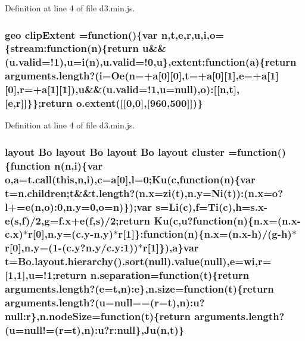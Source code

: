 Definition at line 4 of file d3.\+min.\+js.

\subsubsection[{clip\+Extent}]{ {\bf geo} clip\+Extent =function()\{var {\bf n},t,{\bf e},{\bf r},u,{\bf i},{\bf o}=\{stream\+:function({\bf n})\{{\bf return} u\&\&(u.\+valid=!1),u={\bf i}({\bf n}),u.\+valid=!0,u\},extent\+:function({\bf a})\{{\bf return} arguments.\+length?({\bf i}=Oe({\bf n}=+{\bf a}[0][0],t=+{\bf a}[0][1],{\bf e}=+{\bf a}[1][0],{\bf r}=+{\bf a}[1][1]),u\&\&(u.\+valid=!1,u=null),{\bf o})\+:[[{\bf n},t],[{\bf e},{\bf r}]]\}\};{\bf return} {\bf o.\+extent}([[0,0],[960,500]])\}}\label{d3_8min_8js_ac75a0100b76ea2ac37554c51f4b571b5}


Definition at line 4 of file d3.\+min.\+js.

\subsubsection[{cluster}]{ {\bf layout} {\bf Bo} {\bf layout} {\bf Bo} {\bf layout} {\bf Bo} {\bf layout} cluster =function()\{function {\bf n}({\bf n},{\bf i})\{var {\bf o},{\bf a}={\bf t.\+call}({\bf this},{\bf n},{\bf i}),{\bf c}={\bf a}[0],l=0;{\bf Ku}({\bf c},function({\bf n})\{var t=n.\+children;t\&\&t.\+length?({\bf n.\+x}={\bf zi}(t),n.\+y={\bf Ni}(t))\+:({\bf n.\+x}={\bf o}?l+={\bf e}({\bf n},{\bf o})\+:0,n.\+y=0,{\bf o}={\bf n})\});var s={\bf Li}({\bf c}),{\bf f}={\bf Ti}({\bf c}),h={\bf s.\+x}-\/{\bf e}(s,{\bf f})/2,g={\bf f.\+x}+{\bf e}({\bf f},s)/2;{\bf return} {\bf Ku}({\bf c},u?function({\bf n})\{{\bf n.\+x}=({\bf n.\+x}-\/{\bf c.\+x})$\ast${\bf r}[0],n.\+y=(c.\+y-\/n.\+y)$\ast${\bf r}[1]\}\+:function({\bf n})\{{\bf n.\+x}=({\bf n.\+x}-\/h)/(g-\/h)$\ast${\bf r}[0],n.\+y=(1-\/(c.\+y?n.\+y/c.\+y\+:1))$\ast${\bf r}[1]\}),{\bf a}\}var t={\bf Bo.\+layout.\+hierarchy}().{\bf sort}(null).value(null),{\bf e}={\bf wi},{\bf r}=[1,1],u=!1;{\bf return} n.\+separation=function(t)\{{\bf return} arguments.\+length?({\bf e}=t,{\bf n})\+:{\bf e}\},{\bf n.\+size}=function(t)\{{\bf return} arguments.\+length?(u=null==({\bf r}=t),{\bf n})\+:u?null\+:r\},n.\+node\+Size=function(t)\{{\bf return} arguments.\+length?(u=null!=({\bf r}=t),{\bf n})\+:u?r\+:null\},{\bf Ju}({\bf n},t)\}}\label{d3_8min_8js_ab027a753893e7f9df49715aa2a92a205}


